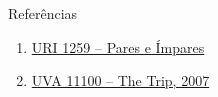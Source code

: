 \begin{frame}[fragile]{Referências}

    \begin{enumerate}
        \item \href{https://www.urionlinejudge.com.br/judge/pt/problems/view/1259}{URI 1259 -- Pares e Ímpares}

        \item \href{https://uva.onlinejudge.org/index.php?option=com_onlinejudge&Itemid=8&category=24&page=show_problem&problem=2041}{UVA 11100 -- The Trip, 2007}

    \end{enumerate}

\end{frame}
